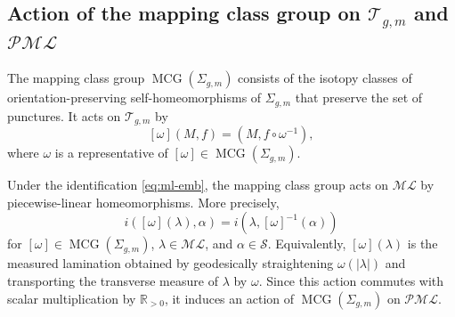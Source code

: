 \documentclass[dvipdfmx]{amsart}
\theoremstyle{remark}
\newcommand{\teich}{\mathcal{T}}
\newcommand{\mcg}{\operatorname{MCG}}
\newcommand{\tmod}{\operatorname{Mod}}
\newcommand{\convgenus}{{\boldsymbol \xi}}
\newcommand{\ml}{\mathcal{ML}}
\newcommand{\pml}{\mathcal{PML}}
\begin{document}

\subsection{Action of the mapping class group on $\teich_{g,m}$ and $\pml$}

The mapping class group $\mcg(\Sigma_{g,m})$ consists of the
isotopy classes of orientation-preserving self-homeomorphisms of
$\Sigma_{g,m}$ that preserve the set of punctures. It acts on
$\teich_{g,m}$ by
\begin{equation}
\label{eq:action_of_mcg_Teichmuller}
[\omega](M,f)=(M,f\circ\omega^{-1}),
\end{equation}
where $\omega$ is a representative of
$[\omega]\in\mcg(\Sigma_{g,m})$.

Under the identification \eqref{eq:ml-emb}, the mapping class group
acts on $\ml$ by piecewise-linear homeomorphisms. More precisely,
\begin{equation}
\label{eq:action_of_mcg-ml}
i([\omega](\lambda),\alpha)
=
i(\lambda,[\omega]^{-1}(\alpha))
\end{equation}
for $[\omega]\in\mcg(\Sigma_{g,m})$, $\lambda\in\ml$, and
$\alpha\in\mathcal S$. Equivalently, $[\omega](\lambda)$ is the
measured lamination obtained by geodesically straightening
$\omega(|\lambda|)$ and transporting the transverse measure of
$\lambda$ by $\omega$. Since this action commutes with scalar
multiplication by $\mathbb R_{>0}$, it induces an action of
$\mcg(\Sigma_{g,m})$ on $\pml$.
\end{document}

